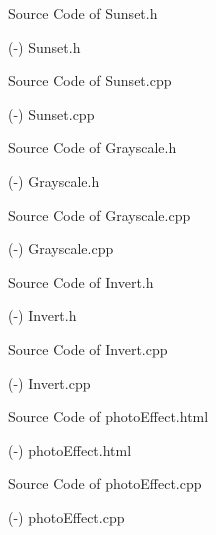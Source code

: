 \filbreak
\sec Source Code of Sunset.h

\verbinput (-) Sunset.h

\filbreak
\sec Source Code of Sunset.cpp

\verbinput (-) Sunset.cpp

\filbreak
\sec Source Code of Grayscale.h

\verbinput (-) Grayscale.h

\filbreak
\sec Source Code of Grayscale.cpp

\verbinput (-) Grayscale.cpp

\filbreak
\sec Source Code of Invert.h

\verbinput (-) Invert.h

\filbreak
\sec Source Code of Invert.cpp

\verbinput (-) Invert.cpp

\filbreak
\sec Source Code of photoEffect.html

\verbinput (-) photoEffect.html

\filbreak
\sec Source Code of photoEffect.cpp

\verbinput (-) photoEffect.cpp



\bye